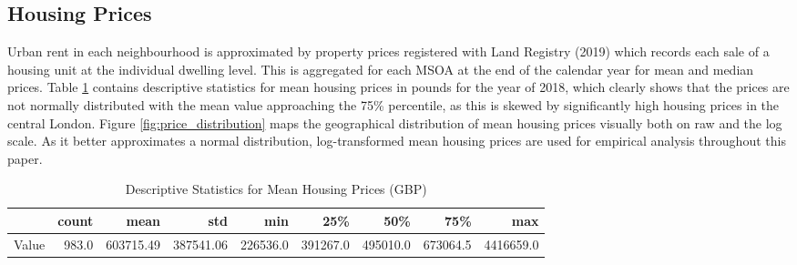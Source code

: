\documentclass{article}
\begin{document}
\subsection{Housing Prices}
Urban rent in each neighbourhood is approximated by property prices registered with Land Registry (2019) which records each sale of a housing unit at the individual dwelling level. This is aggregated for each MSOA at the end of the calendar year for mean and median prices. Table \ref{table:housing} contains descriptive statistics for mean housing prices in pounds for the year of 2018, which clearly shows that the prices are not normally distributed with the mean value approaching the 75\% percentile, as this is skewed by significantly high housing prices in the central London. Figure \ref{fig:price_distribution} maps the geographical distribution of mean housing prices visually both on raw and the log scale. As it better approximates a normal distribution, log-transformed mean housing prices are used for empirical analysis throughout this paper.

\begin{table}[t]
\caption{Descriptive Statistics for Mean Housing Prices (GBP)} 
  \label{table:housing} 
\begin{tabular}{lrrrrrrrr}
\toprule
{} &  count &       mean &        std &       min &       25\% &       50\% &       75\% &        max \\
\midrule
Value &  983.0 &  603715.49 &  387541.06 &  226536.0 &  391267.0 &  495010.0 &  673064.5 &  4416659.0 \\
\bottomrule
\end{tabular}
\end{table}
\end{document}
